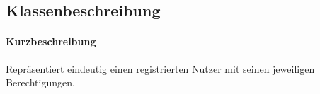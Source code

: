 \subsection*{Klassenbeschreibung}%
\paragraph*{Kurzbeschreibung}
Repräsentiert eindeutig einen registrierten Nutzer mit seinen jeweiligen Berechtigungen.
